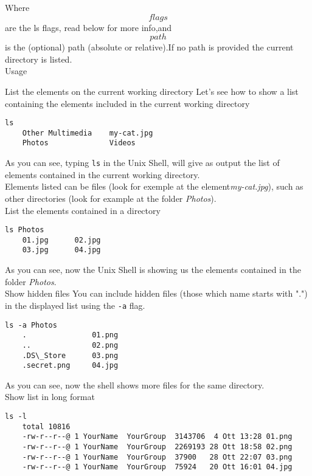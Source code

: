 \documentclass[hidelinks,12pt,a4paper,numbers=enddot]{scrartcl}
\begin{document}
Where \[flags\] are the ls flags, read below for more info,and \[path\] is the
(optional) path (absolute or relative).If no path is provided the current
directory is listed.\\

Usage

List the elements on the current working directory
Let's see how to show a list containing the elements included in the
current working directory

\begin{verbatim}
ls
    Other Multimedia	my-cat.jpg
    Photos				Videos
\end{verbatim}

As you can see, typing \texttt{ls} in the Unix Shell, will give as output
the list of elements contained in the current working directory.\\
Elements listed can be files (look for exemple at the element\emph{my-cat.jpg}),
such as other directories (look for example at the folder \emph{Photos}).\\

List the elements contained in a directory
\begin{verbatim}
ls Photos
    01.jpg		02.jpg
    03.jpg		04.jpg
\end{verbatim}

As you can see, now the Unix Shell is showing us the elements contained
in the folder \emph{Photos}.\\

Show hidden files
You can include hidden files (those  which name starts with ".") in
the displayed list using the \texttt{-a} flag.

\begin{verbatim}
ls -a Photos
    .				01.png
    ..				02.png
    .DS\_Store		03.png
    .secret.png		04.jpg
\end{verbatim}

As you can see, now the shell shows more files for the same directory.\\

Show list in long format

\begin{verbatim}
ls -l
    total 10816
    -rw-r--r--@ 1 YourName  YourGroup  3143706  4 Ott 13:28 01.png
    -rw-r--r--@ 1 YourName  YourGroup  2269193 28 Ott 18:58 02.png
    -rw-r--r--@ 1 YourName  YourGroup  37900   28 Ott 22:07 03.png
    -rw-r--r--@ 1 YourName  YourGroup  75924   20 Ott 16:01 04.jpg
\end{verbatim}
\end{document}
